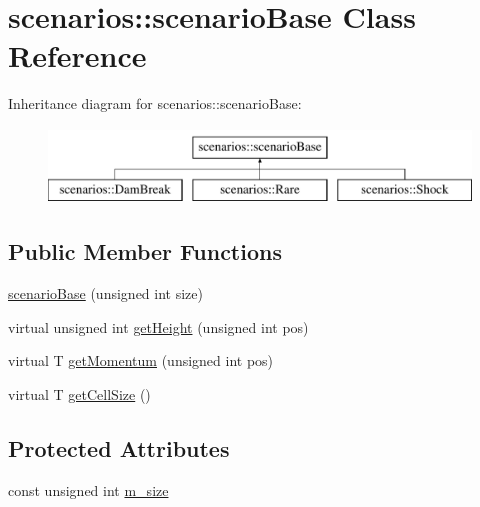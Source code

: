\hypertarget{classscenarios_1_1scenarioBase}{\section{scenarios\-:\-:scenario\-Base Class Reference}
\label{classscenarios_1_1scenarioBase}
}
Inheritance diagram for scenarios\-:\-:scenario\-Base\-:\begin{figure}[H]
\begin{center}
\leavevmode
\includegraphics[height=2.000000cm]{classscenarios_1_1scenarioBase}
\end{center}
\end{figure}
\subsection*{Public Member Functions}
\begin{DoxyCompactItemize}
\item 
\hyperlink{classscenarios_1_1scenarioBase_adb8ed429de97c9d478460906e9d66801}{scenario\-Base} (unsigned int size)
\item 
virtual unsigned int \hyperlink{classscenarios_1_1scenarioBase_ab4b832324300d6921467af8f71b646c2}{get\-Height} (unsigned int pos)
\item 
virtual T \hyperlink{classscenarios_1_1scenarioBase_a21147d04c54908772ea2d060de49327f}{get\-Momentum} (unsigned int pos)
\item 
virtual T \hyperlink{classscenarios_1_1scenarioBase_a76f3d6f7004dda1344e62bb095d7daca}{get\-Cell\-Size} ()
\end{DoxyCompactItemize}
\subsection*{Protected Attributes}
\begin{DoxyCompactItemize}
\item 
const unsigned int \hyperlink{classscenarios_1_1scenarioBase_a67c277c3749ab83d0cb1749200a38791}{m\-\_\-size}
\end{DoxyCompactItemize}


